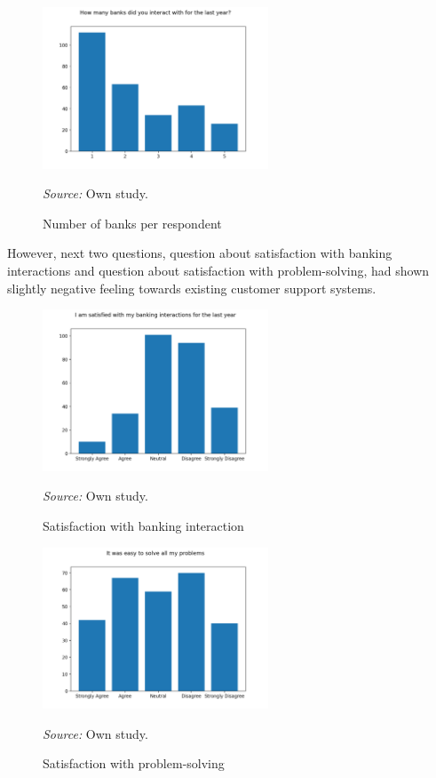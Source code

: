 \begin{figure}
    \centering
    \includegraphics[width=0.6\textwidth,height=\textheight,keepaspectratio]{survey/2_how_many_banks_did_you_interact_with_for_the_last_year?.png}
    \caption{Number of banks per respondent}
    \medskip
    \footnotesize\textit{Source:} Own study.
\end{figure}

However, next two questions, question about satisfaction with banking interactions and question about satisfaction with problem-solving, had shown slightly negative feeling towards existing customer support systems.

\begin{figure}
    \centering
    \includegraphics[width=0.6\textwidth,height=\textheight,keepaspectratio]{survey/3_i_am_satisfied_with_my_banking_interactions_for_the_last_year.png}
    \caption{Satisfaction with banking interaction}
    \medskip
    \footnotesize\textit{Source:} Own study.
\end{figure}

\begin{figure}
    \centering
    \includegraphics[width=0.6\textwidth,height=\textheight,keepaspectratio]{survey/4_it_was_easy_to_solve_all_my_problems.png}
    \caption{Satisfaction with problem-solving}
    \medskip
    \footnotesize\textit{Source:} Own study.
\end{figure}

